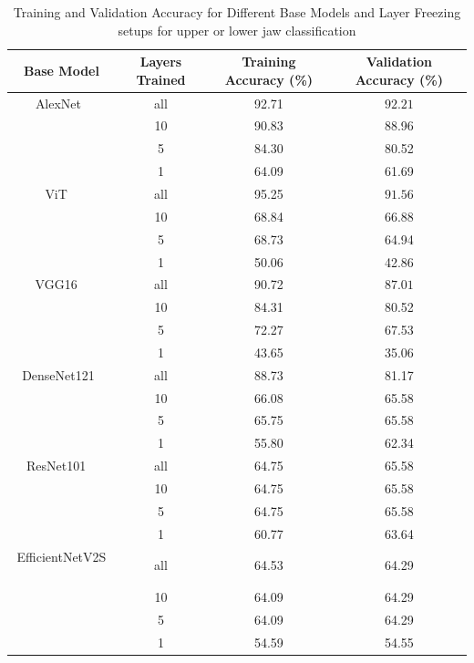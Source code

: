 \documentclass[english,twoside,openright]{UH_DS_MSc}
\begin{document}
\begin{table}[ht]
    \centering
        \scriptsize
        \begin{tabular}{|c|c|c|c|}
            \hline
            \textbf{Base Model} & \textbf{Layers Trained} & \textbf{Training Accuracy (\%)} & \textbf{Validation Accuracy (\%)}  \\ \hline
            AlexNet~\cite{alexnet}& all & 92.71 & $\mathbf{92.21}$       \\
            & 10 & 90.83 & 88.96          \\
             & 5    &84.30 & 80.52     \\
             & 1    & 64.09 & 61.69     \\\hline
             ViT ~\cite{vit}   & all  &95.25 & $\mathbf{91.56}$       \\
            & 10  & 68.84 & 66.88          \\
           & 5  & 68.73 & 64.94           \\
           & 1   &  50.06 & 42.86       \\\hline
           VGG16    ~\cite{vgg} & all  &90.72 & $\mathbf{87.01}$     \\
            & 10  & 84.31 & 80.52       \\
          & 5  &  72.27 & 67.53        \\
           & 1   &  43.65 & 35.06    \\\hline
          DenseNet121~\cite{densenet} & all  & 88.73 & 81.17   \\
            & 10  & 66.08 & 65.58  \\
           & 5  & 65.75 & 65.58   \\
           & 1   &  55.80 & 62.34   \\\hline
ResNet101 ~\cite{resnet}  & all  &            64.75 & 65.58  \\ 
           & 10  &  64.75 & 65.58    \\
           & 5  & 64.75 & 65.58   \\
          & 1   &   60.77 & 63.64  \\\hline
        EfficientNetV2S ~\cite{efficientnetv2}   & all  & 64.53 & 64.29   \\
            & 10  & 64.09 & 64.29    \\
           & 5  & 64.09 & 64.29  \\
          & 1   &   54.59 & 54.55  \\\hline
        \end{tabular}
    \caption{Training and Validation Accuracy for Different Base Models and Layer Freezing setups for upper or lower jaw classification}
    \label{table:results}
\end{table}
\end{document}
